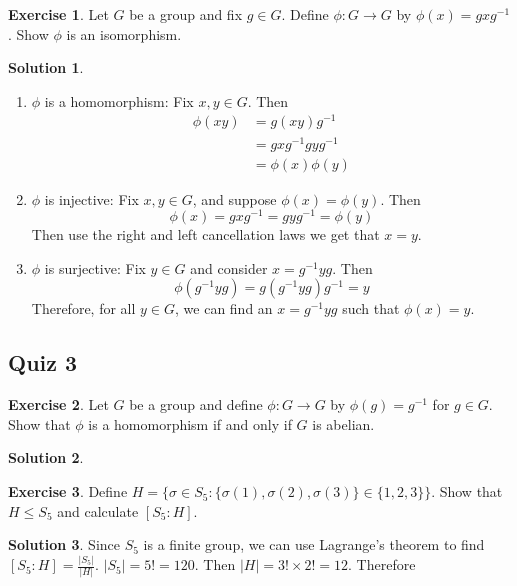 \documentclass[12pt]{article}
\theoremstyle{definition}
\newtheorem{exercise}{\color{YellowOrange}Exercise}
\theoremstyle{definition}
\newtheorem{solution}{\color{Goldenrod}Solution}
\begin{document}
\begin{exercise}
Let $G$ be a group and fix $g \in G$. Define $\phi : G \to G$ by $\phi(x) = gxg^{-1}$. Show $\phi$ is an isomorphism.
\end{exercise}
\begin{solution}
\begin{enumerate}
	\item $\phi$ is a homomorphism: Fix $x, y \in G$. Then
	\begin{align*}
	\phi(xy) &= g (xy) g^{-1} \\
	&= g x g^{-1} g y g^{-1} \\
	&= \phi(x) \phi(y)
	\end{align*}
	\item $\phi$ is injective: Fix $x, y \in G$, and suppose $\phi(x)=\phi(y)$. Then
	\begin{equation}
		\phi(x) = g x g^{-1} = g y g^{-1} = \phi(y) 
	\end{equation}
	Then use the right and left cancellation laws we get that $x = y$.
	\item $\phi$ is surjective: Fix $y \in G$ and consider $x = g^{-1} y g$. Then
	\begin{equation}
		\phi(g^{-1}yg) = g (g^{-1}yg) g^{-1} = y
	\end{equation}
	Therefore, for all $y \in G$, we can find an $x = g^{-1} y g$ such that $\phi(x) = y$.
\end{enumerate}
\end{solution}

\subsection{Quiz 3}
\begin{exercise}
Let $G$ be a group and define $\phi : G \to G$ by $\phi(g) = g^{-1}$ for $g \in G$. Show that $\phi$ is a homomorphism if and only if $G$ is abelian.
\end{exercise}
\begin{solution}

\end{solution}

\begin{exercise}
Define $H = \{\sigma \in S_5 : \{\sigma(1), \sigma(2), \sigma(3) \} \in \{ 1, 2, 3 \} \}$. Show that $H \leq S_5$ and calculate $[S_5 : H]$. 
\end{exercise}
\begin{solution}

Since $S_5$ is a finite group, we can use Lagrange's theorem to find $[S_5 : H] = \frac{|S_5|}{|H|}$.  $|S_5| = 5! = 120$. Then $|H| = 3! \times 2! = 12$. Therefore 
\end{solution}
\end{document}
